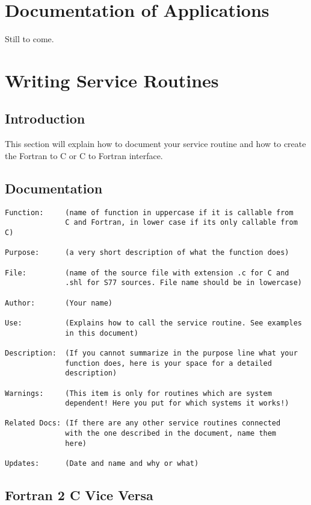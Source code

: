 \chapter{Documentation of Applications}

Still to come.

\chapter{Writing Service Routines}

\section{Introduction}

This section will explain how to document your service routine and how
to create the Fortran to C or C to Fortran interface.

\section{Documentation}

\begin{verbatim}
Function:     (name of function in uppercase if it is callable from
              C and Fortran, in lower case if its only callable from C)

Purpose:      (a very short description of what the function does)

File:         (name of the source file with extension .c for C and
              .shl for S77 sources. File name should be in lowercase)

Author:       (Your name)

Use:          (Explains how to call the service routine. See examples
              in this document)

Description:  (If you cannot summarize in the purpose line what your
              function does, here is your space for a detailed
              description)

Warnings:     (This item is only for routines which are system
              dependent! Here you put for which systems it works!)

Related Docs: (If there are any other service routines connected
              with the one described in the document, name them
              here)

Updates:      (Date and name and why or what)
\end{verbatim}

\section{Fortran 2 C Vice Versa}

